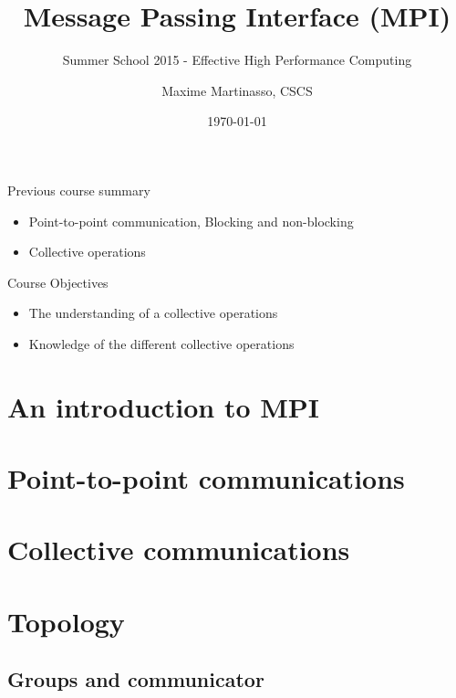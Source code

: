 \documentclass[aspectratio=43]{beamer}
\author{Maxime Martinasso, CSCS}
\title{Message Passing Interface (MPI)}
\subtitle{Summer School 2015 - Effective High Performance Computing}
\date{\today}
\begin{document}
\cscstitle

\begin{frame}{Previous course summary}
\begin{itemize}
\item Point-to-point communication, Blocking and non-blocking
\item Collective operations
\end{itemize}
\end{frame}

\begin{frame}{Course Objectives}
\begin{itemize}
\item The understanding of a collective operations
\item Knowledge of the different collective operations
\end{itemize}
\end{frame}


\section{An introduction to MPI}
\section{Point-to-point communications}
\section{Collective communications}
\section{Topology}


\subsection{Groups and communicator}
\end{document}
